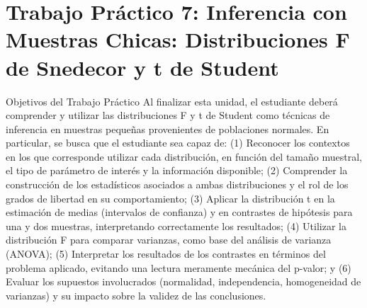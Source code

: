 \documentclass[
  spanish,
  letterpaper,
  DIV=11,
  numbers=noendperiod]{scrreprt}
\begin{document}

\chapter{Trabajo Práctico 7: Inferencia con Muestras Chicas:
Distribuciones F de Snedecor y t de
Student}\label{trabajo-pruxe1ctico-7-inferencia-con-muestras-chicas-distribuciones-f-de-snedecor-y-t-de-student}

Objetivos del Trabajo Práctico Al finalizar esta unidad, el estudiante
deberá comprender y utilizar las distribuciones F y t de Student como
técnicas de inferencia en muestras pequeñas provenientes de poblaciones
normales. En particular, se busca que el estudiante sea capaz de: (1)
Reconocer los contextos en los que corresponde utilizar cada
distribución, en función del tamaño muestral, el tipo de parámetro de
interés y la información disponible; (2) Comprender la construcción de
los estadísticos asociados a ambas distribuciones y el rol de los grados
de libertad en su comportamiento; (3) Aplicar la distribución t en la
estimación de medias (intervalos de confianza) y en contrastes de
hipótesis para una y dos muestras, interpretando correctamente los
resultados; (4) Utilizar la distribución F para comparar varianzas, como
base del análisis de varianza (ANOVA); (5) Interpretar los resultados de
los contrastes en términos del problema aplicado, evitando una lectura
meramente mecánica del p-valor; y (6) Evaluar los supuestos involucrados
(normalidad, independencia, homogeneidad de varianzas) y su impacto
sobre la validez de las conclusiones.
\end{document}

